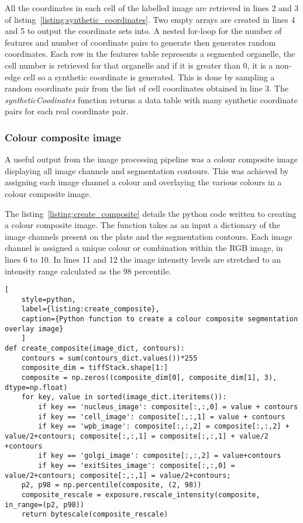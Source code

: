 All the coordinates in each cell of the labelled image are retrieved in lines 2 and 3 of listing~\ref{listing:synthetic_coordinates}. Two empty arrays are created in lines 4 and 5 to output the coordinate sets into. A nested for-loop for the number of features and number of coordinate pairs to generate then generates random coordinates. Each row in the features table represents a segmented organelle, the cell number is retrieved for that organelle and if it is greater than 0, it is a non-edge cell so a synthetic coordinate is generated. This is done by sampling a random coordinate pair from the list of cell coordinates obtained in line 3. The \emph{syntheticCoodinates} function returns a data table with many synthetic coordinate pairs for each real coordinate pair.

\subsubsection{Colour composite image}
A useful output from the image processing pipeline was a colour composite image displaying all image channels and segmentation contours. This was achieved by assigning each image channel a colour and overlaying the various colours in a colour composite image.

The listing~\ref{listing:create_composite} details the python code written to creating a colour composite image. The function takes as an input a dictionary of the image channels present on the plate and the segmentation contours. Each image channel is assigned a unique colour or combination within the RGB image, in lines 6 to 10. In lines 11 and 12 the image intensity levels are stretched to an intensity range calculated as the 98 percentile.

\begin{lstlisting}[
	style=python,
	label={listing:create_composite},
	caption={Python function to create a colour composite segmentation overlay image}
	]
def create_composite(image_dict, contours):
    contours = sum(contours_dict.values())*255
    composite_dim = tiffStack.shape[1:]
    composite = np.zeros((composite_dim[0], composite_dim[1], 3), dtype=np.float)
    for key, value in sorted(image_dict.iteritems()):
        if key == 'nucleus_image': composite[:,:,0] = value + contours
        if key == 'cell_image': composite[:,:,1] = value + contours
        if key == 'wpb_image': composite[:,:,2] = composite[:,:,2] + value/2+contours; composite[:,:,1] = composite[:,:,1] + value/2 +contours
        if key == 'golgi_image': composite[:,:,2] = value+contours
        if key == 'exitSites_image': composite[:,:,0] = value/2+contours; composite[:,:,1] = value/2+contours;
    p2, p98 = np.percentile(composite, (2, 98))
    composite_rescale = exposure.rescale_intensity(composite, in_range=(p2, p98))
    return bytescale(composite_rescale)
\end{lstlisting}

